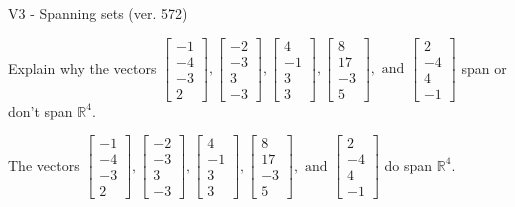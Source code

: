 \begin{exercise}
  \begin{exerciseTitle}V3 - Spanning sets (ver. 572)\end{exerciseTitle}
  \begin{exerciseStatement}
    Explain why the vectors \(\left[\begin{array}{r}
-1 \\
-4 \\
-3 \\
2
\end{array}\right] , \left[\begin{array}{r}
-2 \\
-3 \\
3 \\
-3
\end{array}\right] , \left[\begin{array}{r}
4 \\
-1 \\
3 \\
3
\end{array}\right] , \left[\begin{array}{r}
8 \\
17 \\
-3 \\
5
\end{array}\right] , \text{ and } \left[\begin{array}{r}
2 \\
-4 \\
4 \\
-1
\end{array}\right]\) span or don't span \(\mathbb{R}^4\). 
	


  \end{exerciseStatement}
  \begin{exerciseAnswer}
   The vectors \(\left[\begin{array}{r}
-1 \\
-4 \\
-3 \\
2
\end{array}\right] , \left[\begin{array}{r}
-2 \\
-3 \\
3 \\
-3
\end{array}\right] , \left[\begin{array}{r}
4 \\
-1 \\
3 \\
3
\end{array}\right] , \left[\begin{array}{r}
8 \\
17 \\
-3 \\
5
\end{array}\right] , \text{ and } \left[\begin{array}{r}
2 \\
-4 \\
4 \\
-1
\end{array}\right]\) 
  	 do  
	span \(\mathbb{R}^4\).
  



\end{exerciseAnswer}
\end{exercise}
